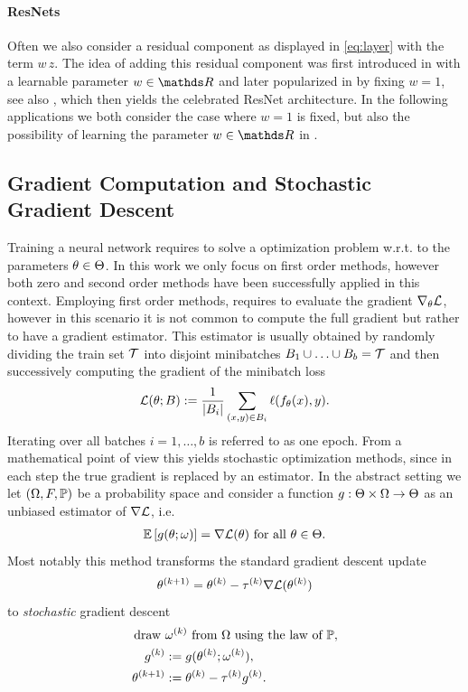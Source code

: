 \paragraph{ResNets} Often we also consider a residual component as displayed in \cref{eq:layer} with the term $w\, z$. The idea of adding this residual component was first introduced in \cite{srivastava2015highway} with a learnable parameter $w\in\R$ and later popularized in \cite{he2016deep} by fixing $w=1$, see also \cite{he2016identity}, which then yields the celebrated ResNet architecture. In the following applications we both consider the case where $w=1$ is fixed, but also the possibility of learning the parameter $w\in\R$ in \cite{bungert2021neural}.
%
\subsection{Gradient Computation and Stochastic Gradient Descent}\label{sec:SGD}
%
%
Training a neural network requires to solve a optimization problem w.r.t. to the parameters $\param\in\Param$. In this work we only focus on first order methods, however both zero \cite{riedl2022leveraging, pinnau2017consensus, carrillo2021consensus} and second order methods \cite{martens2010deep} have been successfully applied in this context. Employing first order methods, requires to evaluate the gradient $\nabla_\theta \empLoss$, however in this scenario it is not common to compute the full gradient but rather to have a gradient estimator. This estimator is usually obtained by randomly dividing the train set $\trSet$ into disjoint minibatches $B_1\cup\ldots\cup B_b = \trSet$ and then successively computing the gradient of the minibatch loss
%
\begin{align*}
\empLoss(\param;B):=\frac{1}{\abs{B_i}}\sum_{(x,y)\in B_i} \ell(f_\param(x), y).
\end{align*}
%
%
Iterating over all batches $i=1,\ldots,b$ is referred to as one epoch. From a mathematical point of view this yields stochastic optimization methods, since in each step the true gradient is replaced by an estimator. In the abstract setting we let $(\Omega,F,\P)$ be a probability space and consider a function $g:\Param\times \Omega\to \Param$ as an unbiased estimator of $\nabla\empLoss$, i.e.
%
\begin{align*}
\Exp{g(\param;\omega)} = \nabla\empLoss(\param)\text{ for all } \param\in\Param.
\end{align*}
%
Most notably this method transforms the standard gradient descent update \cite{cauchy1847methode}
%
\begin{align*}
\param^{(k+1)} = \param^{(k)} - \tau^{(k)} \nabla \empLoss(\theta^{(k)})
\end{align*}
%
to \emph{stochastic} gradient descent \cite{robbins1951stochastic}
%
\begin{align*}
\text{draw }&\omega^{(k)}\text{ from }\Omega\text{ using the law of }\P,\\
g^{(k)} &:= {g(\param^{(k)};\omega^{(k)})},\\
\param^{(k+1)} &:= \param^{(k)} - \tau^{(k)} g^{(k)}.
\end{align*}
%
%
%
%
%
\clearpage%
